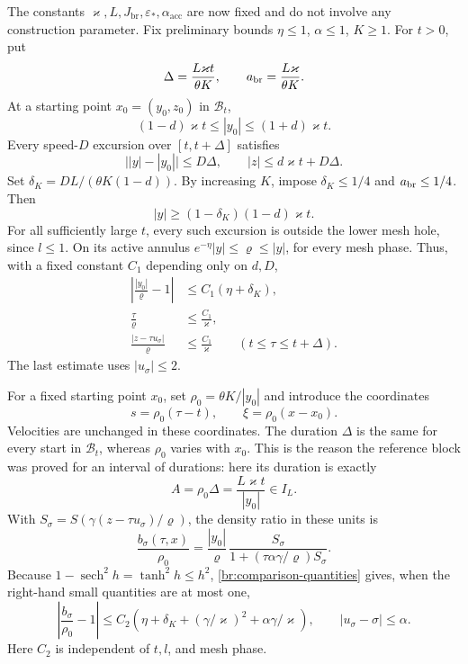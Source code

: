 The constants \(\varkappa,L,J_{\mathrm{br}},\varepsilon_*,\alpha_{\mathrm{acc}}\) are now
fixed and do not involve any construction parameter. Fix preliminary
bounds \(\eta\le1\), \(\alpha\le1\), \(K\ge1\). For \(t>0\), put
\begin{equation}\label{br:moving-box}
\Delta=\frac{L\varkappa t}{\theta K},
\qquad a_{\rm br}=\frac{L\varkappa}{\theta K}.
\end{equation}
At a starting point \(x_0=(y_0,z_0)\) in \(\mathcal B_t\),
\[
(1-d)\varkappa t\le|y_0|\le(1+d)\varkappa t.
\]
Every speed-\(D\) excursion over \([t,t+\Delta]\) satisfies
\[
\big||y|-|y_0|\big|\le D\Delta,\qquad
|z|\le d\varkappa t+D\Delta.
\]
Set \(\delta_K=DL/(\theta K(1-d))\). By increasing \(K\), impose
\(\delta_K\le1/4\) and \(a_{\rm br}\le1/4\). Then
\[
|y|\ge(1-\delta_K)(1-d)\varkappa t.
\]
For all sufficiently large \(t\), every such excursion is outside the
lower mesh hole, since \(l\le1\). On its active annulus
\(e^{-\eta}|y|\le\varrho\le|y|\), for every mesh phase. Thus, with a fixed
constant \(C_1\) depending only on \(d,D\),
\begin{equation}\label{br:comparison-quantities}
\begin{split}
\left|\frac{|y_0|}{\varrho}-1\right|&\le C_1(\eta+\delta_K),\\
\frac{\tau}{\varrho}&\le\frac{C_1}{\varkappa},\\
\frac{|z-\tau u_\sigma|}{\varrho}&\le\frac{C_1}{\varkappa}
\qquad(t\le\tau\le t+\Delta).
\end{split}
\end{equation}
The last estimate uses \(|u_\sigma|\le2\).

For a fixed starting point \(x_0\), set
\(\rho_0=\theta K/|y_0|\) and introduce the coordinates
\[
 s=\rho_0(\tau-t),\qquad \xi=\rho_0(x-x_0).
\]
Velocities are unchanged in these coordinates. The duration
\(\Delta\) is the same for every start in \(\mathcal B_t\), whereas
\(\rho_0\) varies with \(x_0\). This is the reason the reference block
was proved for an interval of durations: here its duration is exactly
\begin{equation}\label{br:duration-scaling}
A=\rho_0\Delta=\frac{L\varkappa t}{|y_0|}\in I_L.
\end{equation}
With \(S_\sigma=S(\gamma(z-\tau u_\sigma)/\varrho)\), the density ratio
in these units is
\begin{equation}\label{br:density-ratio}
\frac{b_\sigma(\tau,x)}{\rho_0}
=\frac{|y_0|}{\varrho}\,
\frac{S_\sigma}{1+(\tau\alpha\gamma/\varrho)S_\sigma}.
\end{equation}
Because \(1-\operatorname{sech}^2 h=\tanh^2h\le h^2\),
\eqref{br:comparison-quantities} gives, when the right-hand small
quantities are at most one,
\begin{equation}\label{br:uniform-medium-error}
\left|\frac{b_\sigma}{\rho_0}-1\right|
\le C_2\left(\eta+\delta_K+
              (\gamma/\varkappa)^2+\alpha\gamma/\varkappa\right),
\qquad |u_\sigma-\sigma|\le\alpha.
\end{equation}
Here \(C_2\) is independent of \(t,l\), and mesh phase.

